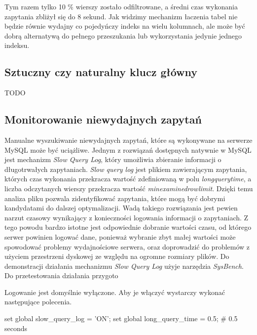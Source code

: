 Tym razem tylko 10 \% wierszy zostało odfiltrowane, a średni czas wykonania zapytania zbliżył się do 8 sekund. Jak widzimy mechanizm łaczenia tabel nie będzie równie wydajny co pojedyńczy indeks na wielu kolumnach, ale może być dobrą alternatywą do pełnego przeszukania lub wykorzystania jedynie jednego indeksu.
\subsection{Sztuczny czy naturalny klucz główny}
TODO

\subsection{Monitorowanie niewydajnych zapytań}
Manualne wyszukiwanie niewydajnych zapytań, które są wykonywane na serwerze MySQL może być uciążliwe. Jednym z rozwiązań dostępnych natywnie w MySQL jest mechanizm \textit{Slow Query Log}, który umożliwia zbieranie informacji o długotrwałych zapytaniach. \textit{Slow query log} jest plikiem zawierającym zapytania, których czas wykonania przekracza wartość zdefiniowaną w polu \textit{long\textunderscore query\textunderscore time}, a liczba odczytanych wierszy przekracza wartość \textit{min\textunderscore examined\textunderscore row\textunderscore limit}. Dzięki temu analiza pliku pozwala zidentyfikować zapytania, które mogą być dobrymi kandydatami do dalszej optymalizacji. Wadą takiego rozwiązania jest pewien narzut czasowy wynikający z konieczności logowania informacji o zapytaniach. Z tego powodu bardzo istotne jest odpowiednie dobranie wartości czasu, od którego serwer powinien logować dane, ponieważ wybranie zbyt małej wartości może spowodować problemy wydajnościowe serwera, oraz doprowadzić do problemów z użyciem przestrzeni dyskowej ze względu na ogromne rozmiary plików. Do demonstracji działania mechanizmu \textit{Slow Query Log} użyje narzędzia \textit{SysBench}. Do przetestowania działania przygoto

Logowanie jest domyślnie wyłączone. Aby je włączyć wystarczy wykonać następujące polecenia.
\begin{spverbatim}
	set global slow_query_log = 'ON';
	set global long_query_time = 0.5; # 0.5 seconds
\end{spverbatim}

